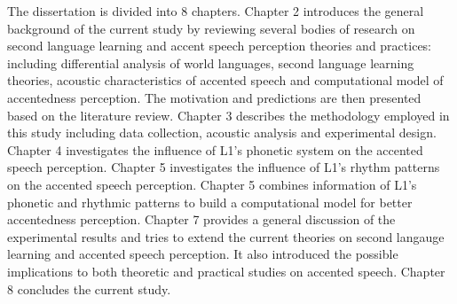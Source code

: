 The dissertation is divided into 8 chapters. Chapter 2 introduces the general background of the current study by reviewing several bodies of research on second language learning and accent speech perception theories and practices: including differential analysis of world languages, second language learning theories, acoustic characteristics of accented speech and computational model of accentedness perception. The motivation and predictions are then presented based on the literature review. Chapter 3 describes the methodology employed in this study including data collection, acoustic analysis and experimental design. Chapter 4 investigates the influence of L1's phonetic system on the accented speech perception. Chapter 5 investigates the influence of L1's rhythm patterns on the accented speech perception. Chapter 5 combines information of L1's phonetic and rhythmic patterns to build a computational model for better accentedness perception. Chapter 7 provides a general discussion of the experimental results and tries to extend the current theories on second langauge learning and accented speech perception. It also introduced the possible implications to both theoretic and practical studies on accented speech. Chapter 8 concludes the current study.



